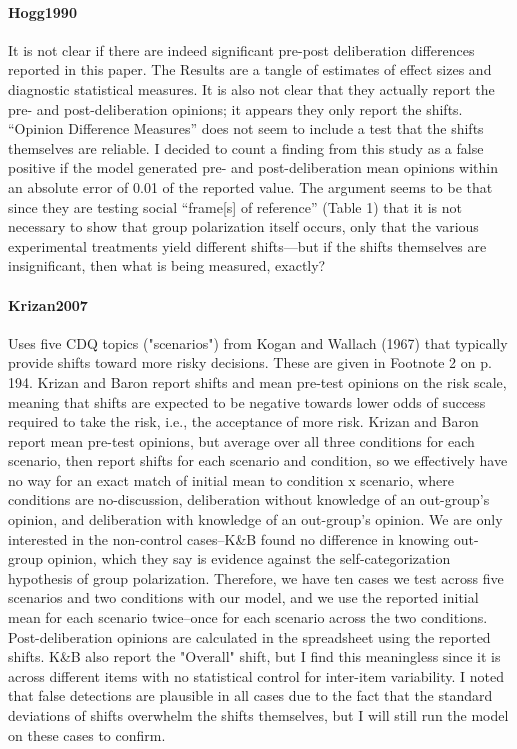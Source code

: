 \documentclass[11pt, letterpaper]{article}
\begin{document}
\paragraph{{Hogg1990}} It is not clear if there are indeed significant
pre-post deliberation differences reported in this paper. The Results are a
tangle of estimates of effect sizes and diagnostic statistical measures. It
is also not clear that they actually report the pre- and post-deliberation
opinions; it appears they only report the shifts. ``Opinion Difference
Measures'' does not seem to include a test that the shifts themselves are
reliable. I decided to count a finding from this study as a false positive if
the model generated pre- and post-deliberation mean opinions within an
absolute error of 0.01 of the reported value. The argument seems to be that
since they are testing social ``frame[s] of reference'' (Table 1) that it is
not necessary to show that group polarization itself occurs, only that the
various experimental treatments yield different shifts---but if the shifts
themselves are insignificant, then what is being measured, exactly?

\paragraph{{Krizan2007}} Uses five CDQ topics ("scenarios") from Kogan and
Wallach (1967) that typically provide shifts toward more risky decisions.  These are
given in Footnote 2 on p. 194. Krizan and Baron report shifts and mean pre-test
opinions on the risk scale, meaning that shifts are expected to be negative towards
lower odds of success required to take the risk, i.e., the acceptance of more risk.
Krizan and Baron report mean pre-test opinions, but average over all three conditions
for each scenario, then report shifts for each scenario and condition, so we
effectively have no way for an exact match of initial mean to condition x scenario,
where conditions are no-discussion, deliberation without knowledge of an out-group's
opinion, and deliberation with knowledge of an out-group's opinion. We are only
interested in the non-control cases--K\&B found no difference in knowing out-group
opinion, which they say is evidence against the self-categorization hypothesis of group
polarization.  Therefore, we have ten cases we test across five scenarios and two
conditions with our model, and we use the reported initial mean for each scenario
twice--once for each scenario across the two conditions. Post-deliberation opinions are
calculated in the spreadsheet using the reported shifts. K\&B also report the "Overall"
shift, but I find this meaningless since it is across different items with no
statistical control for inter-item variability. I noted that false detections are
plausible in all cases due to the fact that the standard deviations of shifts overwhelm
the shifts themselves, but I will still run the model on these cases to confirm.
\end{document}
